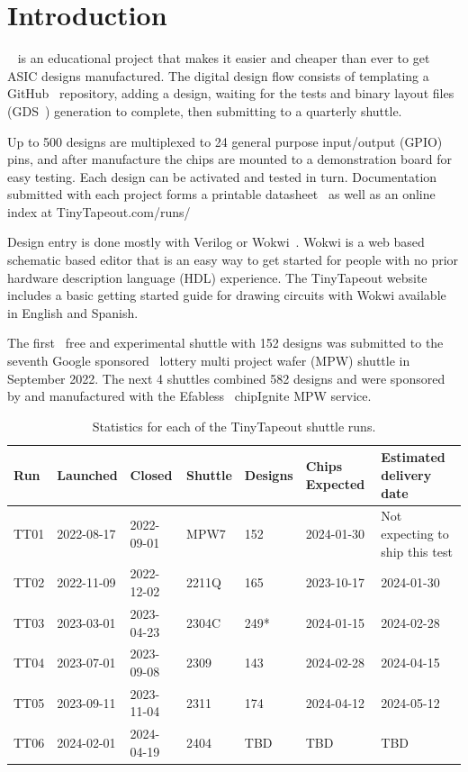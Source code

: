 \section{Introduction}
\label{sec:introduction}
~\cite{tinytapeout} is an educational project that makes it easier and cheaper than ever to get ASIC designs manufactured.
The digital design flow consists of templating a GitHub~\cite{github} repository, adding a design, waiting for the tests and binary layout files (GDS~\cite{gds}) generation to complete, then submitting to a quarterly shuttle.

Up to 500 designs are multiplexed to 24 general purpose input/output (GPIO) pins, and after manufacture the chips are mounted to a demonstration board for easy testing.
Each design can be activated and tested in turn.
Documentation submitted with each project forms a printable datasheet~\cite{datasheet} as well as an online index at TinyTapeout.com/runs/~\cite{tinytapeoutruns}

Design entry is done mostly with Verilog or Wokwi~\cite{wokwi}.
Wokwi is a web based schematic based editor that is an easy way to get started for people with no prior hardware description language (HDL) experience.
The TinyTapeout website includes a basic getting started guide for drawing circuits with Wokwi available in English and Spanish.

The first~\cite{firstshuttle} free and experimental shuttle with 152 designs was submitted to the seventh Google sponsored~\cite{googlesponsored} lottery multi project wafer (MPW) shuttle in September 2022.
The next 4 shuttles combined 582 designs and were sponsored by and manufactured with the Efabless~\cite{efabless} chipIgnite MPW service.

\begin{table}[htbp]
\centering
\caption{Statistics for each of the TinyTapeout shuttle runs.}
\label{tab:tinytapeout}
\begin{tabularx}{\textwidth}{@{}l *{6}{X}@{}}
\toprule
\textbf{Run} & \textbf{Launched} & \textbf{Closed} & \textbf{Shuttle} & \textbf{Designs} & \textbf{Chips Expected} & \textbf{Estimated delivery date} \\
\midrule
TT01 & 2022-08-17 & 2022-09-01 & MPW7  & 152 & 2024-01-30 & Not expecting to ship this test \\
TT02 & 2022-11-09 & 2022-12-02 & 2211Q & 165 & 2023-10-17 & 2024-01-30 \\
TT03 & 2023-03-01 & 2023-04-23 & 2304C & 249* & 2024-01-15 & 2024-02-28 \\
TT04 & 2023-07-01 & 2023-09-08 & 2309  & 143 & 2024-02-28 & 2024-04-15 \\
TT05 & 2023-09-11 & 2023-11-04 & 2311  & 174 & 2024-04-12 & 2024-05-12 \\
TT06 & 2024-02-01 & 2024-04-19 & 2404  & TBD & TBD        & TBD \\
\bottomrule
\end{tabularx}
\end{table}

